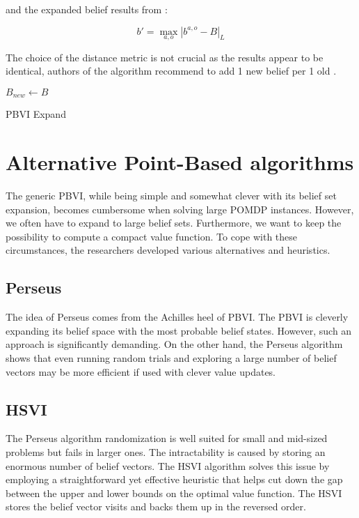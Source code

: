 and the expanded belief results from :

\begin{equation}b' = \operatorname*{max}_{a, o} |b^{a, o} - B|_L\end{equation}

The choice of the distance metric is not crucial as the results appear to be identical, authors of the algorithm recommend to add 1 new belief per 1 old \cite{pbvi}.


\LinesNumbered
\begin{algorithm}[H]
\SetAlgoLined
$B_{new} \xleftarrow{} B$ 
\caption{PBVI Expand}
\end{algorithm}



\section{Alternative Point-Based algorithms}

The generic PBVI, while being simple and somewhat clever with its belief set expansion, becomes cumbersome when solving large POMDP instances. However, we often have to expand to large belief sets. Furthermore, we want to keep the possibility to compute a compact value function. To cope with these circumstances, the researchers developed various alternatives and heuristics.


\subsection{Perseus}

The idea of Perseus \cite{perseus} comes from the Achilles heel of PBVI. The PBVI is cleverly expanding its belief space with the most probable belief states. However, such an approach is significantly demanding. On the other hand, the Perseus algorithm shows that even running random trials and exploring a large number of belief vectors may be more efficient if used with clever value updates.


\subsection{HSVI}
The Perseus algorithm randomization is well suited for small and mid-sized problems but fails in larger ones. The intractability is caused by storing an enormous number of belief vectors. The HSVI \cite{hsvi} algorithm solves this issue by employing a straightforward yet effective heuristic that helps cut down the gap between the upper and lower bounds on the optimal value function. The HSVI stores the belief vector visits and backs them up in the reversed order.


